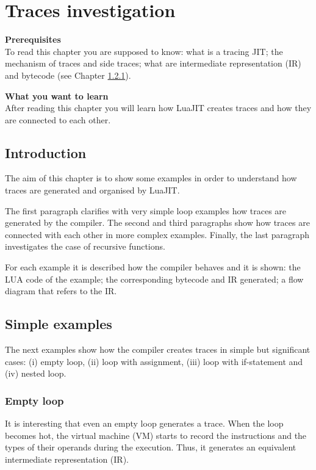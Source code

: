 \chapter{Traces investigation}
\begin{multicols}{2}
\noindent
\textbf{Prerequisites}\\
To read this chapter you are supposed to know: what is a tracing JIT; the mechanism of traces and side traces; what are intermediate representation (IR) and bytecode (see Chapter \ref{}).

\columnbreak
\noindent
\textbf{What you want to learn}\\
After reading this chapter you will learn how LuaJIT creates traces and how they are connected to each other.
\end{multicols}

\section{Introduction}
\noindent
The aim of this chapter is to show some examples in order to understand how traces are generated and organised by LuaJIT. 

The first paragraph clarifies with very simple loop examples how traces are generated by the compiler. The second and third paragraphs show how traces are connected with each other in more complex examples. Finally, the last paragraph investigates the case of recursive functions.

For each example it is described how the compiler behaves and it is shown: the LUA code of the example; the corresponding bytecode and IR generated; a flow diagram that refers to the IR.


\section{Simple examples}
The next examples show how the compiler creates traces in simple but significant cases: (i) empty loop, (ii) loop with assignment, (iii) loop with if-statement and (iv) nested loop.

\subsection{Empty loop}
It is interesting that even an empty loop generates a trace. When the loop becomes hot, the virtual machine (VM) starts to record the instructions and the types of their operands during the execution. Thus, it generates an equivalent intermediate representation (IR). 

